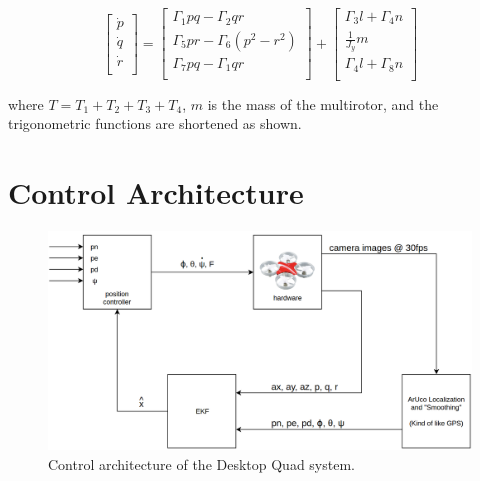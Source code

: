 \documentclass[12pt]{article}
\begin{document}
\singlespacing
\begin{equation}
\begin{bmatrix}
\dot{p} \\
\dot{q} \\
\dot{r} \\
\end{bmatrix}
=
\begin{bmatrix}
\Gamma_1pq - \Gamma_2qr \\
\Gamma_5pr - \Gamma_6(p^2-r^2) \\
\Gamma_7pq - \Gamma_1qr \\
\end{bmatrix}
+
\begin{bmatrix}
\Gamma_3l + \Gamma_4n \\
\frac{1}{J_y}m \\
\Gamma_4l + \Gamma_8n \\
\end{bmatrix}
\end{equation}
\doublespacing

\noindent where $T = T_1 + T_2 + T_3 + T_4$, $m$ is the mass of the multirotor, and the trigonometric functions are shortened as shown.


\section{Control Architecture}

\begin{figure}[H]
	\centering
	\includegraphics[scale=0.23]{desktopquad_control_arch}
	\caption{Control architecture of the Desktop Quad system.}
	\label{fig:architecture}
\end{figure}
\end{document}
